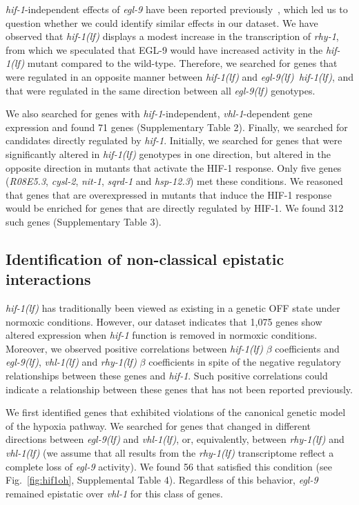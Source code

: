 \documentclass[9pt,twocolumn,twoside]{pnas-new}
\newcommand{\gene}[1]{\mbox{\emph{#1}}}
\newcommand{\egl}{\gene{egl-9(lf)}}
\newcommand{\rhy}{\gene{rhy-1(lf)}}
\newcommand{\vhl}{\gene{vhl-1(lf)}}
\newcommand{\eglhif}{\gene{egl-9(lf) hif-1(lf)}}
\newcommand{\hif}{\gene{hif-1(lf)}}
\newcommand{\eglp}{EGL-9}
\newcommand{\hifp}{HIF-1}
\newcommand{\hifn}{1,075}
\newcommand{\vhltargets}{71} %
\newcommand{\hiftargets}{312}
\newcommand{\hifohtargets}{56}
\begin{document}
\gene{hif-1}-independent effects of \gene{egl-9} have been reported
previously~\cite{Park2012}, which led us to question whether we could identify
similar effects in our dataset. We have observed that \hif{} displays a modest
increase in the transcription of \gene{rhy-1}, from which we speculated that
\eglp{} would have increased activity in the \hif{} mutant compared to the
wild-type. Therefore, we searched for genes that were regulated in an opposite
manner between \hif{} and \eglhif{}, and that were regulated in the same
direction between all \egl{} genotypes.

We also searched for genes with \gene{hif-1}-independent, \gene{vhl-1}-dependent
gene expression and found \vhltargets{} genes (Supplementary Table 2). Finally,
we searched for candidates directly regulated by \gene{hif-1}. Initially, we
searched for genes that were significantly altered in \hif{} genotypes in one
direction, but altered in the opposite direction in mutants that activate the
\hifp{} response. Only five genes (\gene{R08E5.3}, \gene{cysl-2}, \gene{nit-1},
\gene{sqrd-1} and \gene{hsp-12.3}) met these conditions. We reasoned that genes
that are overexpressed in mutants that induce the \hifp{} response would be
enriched for genes that are directly regulated by \hifp{}. We found
\hiftargets{} such genes (Supplementary Table 3).

\subsection*{Identification of non-classical epistatic interactions}
\label{sub:hifoh}
\hif{} has traditionally been viewed as existing in a genetic OFF state under
normoxic conditions. However, our dataset indicates that \hifn{} genes show
altered expression when \gene{hif-1} function is removed in normoxic conditions.
Moreover, we observed positive correlations between \hif{} $\beta$ coefficients
and \egl{}, \vhl{} and \rhy{} $\beta$ coefficients in spite of the negative
regulatory relationships between these genes and \gene{hif-1}. Such positive
correlations could indicate a relationship between these genes that has not
been reported previously.

We first identified genes that exhibited violations of the canonical genetic
model of the hypoxia pathway. We searched for genes that changed in different
directions between \egl{} and \vhl{}, or, equivalently, between \rhy{} and
\vhl{} (we assume that all results from the \rhy{} transcriptome reflect a
complete loss of \gene{egl-9} activity). We found \hifohtargets{} that satisfied
this condition (see Fig.~\ref{fig:hif1oh}, Supplemental Table 4). Regardless of
this behavior, \gene{egl-9} remained epistatic over \gene{vhl-1} for this class
of genes.
\end{document}
